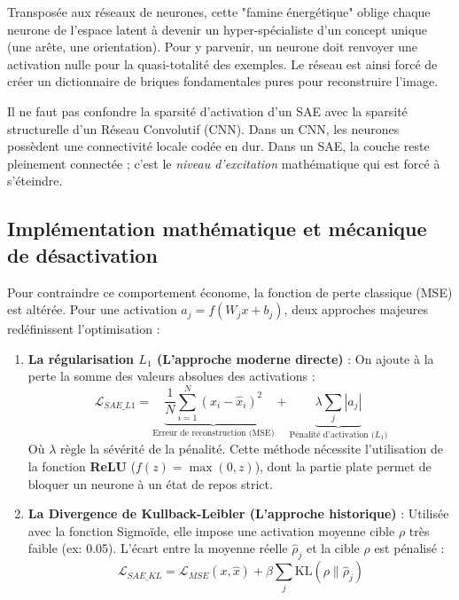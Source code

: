 \documentclass[11pt,a4paper]{report}
\begin{document}
Transposée aux réseaux de neurones, cette "famine énergétique" oblige chaque neurone de l'espace latent à devenir un hyper-spécialiste d'un concept unique (une arête, une orientation). Pour y parvenir, un neurone doit renvoyer une activation nulle pour la quasi-totalité des exemples. Le réseau est ainsi forcé de créer un dictionnaire de briques fondamentales pures pour reconstruire l'image.

\begin{tcolorbox}[colback=blue!5!white,colframe=blue!75!black,title=\textbf{Note : Sparsité d'activation vs Connectivité locale}]
Il ne faut pas confondre la sparsité d'activation d'un SAE avec la sparsité structurelle d'un Réseau Convolutif (CNN). Dans un CNN, les neurones possèdent une connectivité locale codée en dur. Dans un SAE, la couche reste pleinement connectée ; c'est le \textit{niveau d'excitation} mathématique qui est forcé à s'éteindre.
\end{tcolorbox}

\subsection{Implémentation mathématique et mécanique de désactivation}

Pour contraindre ce comportement économe, la fonction de perte classique (MSE) est altérée. Pour une activation $a_j = f(W_j x + b_j)$, deux approches majeures redéfinissent l'optimisation :

\begin{enumerate}
    \item \textbf{La régularisation $L_1$ (L'approche moderne directe)} : 
    On ajoute à la perte la somme des valeurs absolues des activations :
    \begin{equation}
        \mathcal{L}_{SAE\_L1} = \underbrace{\frac{1}{N}\sum_{i=1}^{N}(x_i - \hat{x}_i)^2}_{\text{Erreur de reconstruction (MSE)}} + \underbrace{\lambda \sum_{j} |a_j|}_{\text{Pénalité d'activation ($L_1$)}}
    \end{equation}
    Où $\lambda$ règle la sévérité de la pénalité. Cette méthode nécessite l'utilisation de la fonction \textbf{ReLU} ($f(z) = \max(0, z)$), dont la partie plate permet de bloquer un neurone à un état de repos strict.
    
    \item \textbf{La Divergence de Kullback-Leibler (L'approche historique)} : 
    Utilisée avec la fonction Sigmoïde, elle impose une activation moyenne cible $\rho$ très faible (ex: 0.05). L'écart entre la moyenne réelle $\hat{\rho}_j$ et la cible $\rho$ est pénalisé :
    \begin{equation}
        \mathcal{L}_{SAE\_KL} = \mathcal{L}_{MSE}(x, \hat{x}) + \beta \sum_{j} \text{KL}(\rho \parallel \hat{\rho}_j)
    \end{equation}
\end{enumerate}
\end{document}
